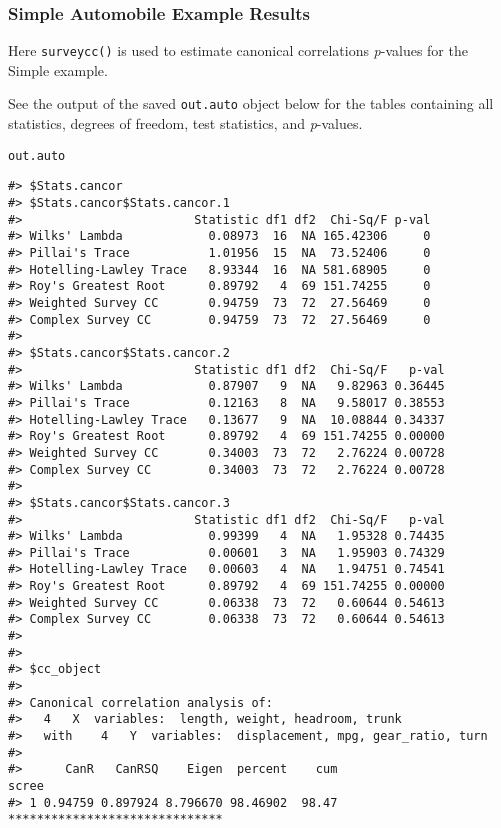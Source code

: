 \hypertarget{simple-automobile-example-results}{%
\subsubsection{Simple Automobile Example Results}\label{simple-automobile-example-results}}

Here \texttt{surveycc()} is used to estimate canonical correlations \emph{p}-values for the Simple example.

See the output of the saved \texttt{out.auto} object below for the tables containing all statistics, degrees of freedom, test statistics, and \emph{p}-values.

\begin{verbatim}
out.auto
\end{verbatim}

\begin{verbatim}
#> $Stats.cancor
#> $Stats.cancor$Stats.cancor.1
#>                        Statistic df1 df2  Chi-Sq/F p-val
#> Wilks' Lambda            0.08973  16  NA 165.42306     0
#> Pillai's Trace           1.01956  15  NA  73.52406     0
#> Hotelling-Lawley Trace   8.93344  16  NA 581.68905     0
#> Roy's Greatest Root      0.89792   4  69 151.74255     0
#> Weighted Survey CC       0.94759  73  72  27.56469     0
#> Complex Survey CC        0.94759  73  72  27.56469     0
#> 
#> $Stats.cancor$Stats.cancor.2
#>                        Statistic df1 df2  Chi-Sq/F   p-val
#> Wilks' Lambda            0.87907   9  NA   9.82963 0.36445
#> Pillai's Trace           0.12163   8  NA   9.58017 0.38553
#> Hotelling-Lawley Trace   0.13677   9  NA  10.08844 0.34337
#> Roy's Greatest Root      0.89792   4  69 151.74255 0.00000
#> Weighted Survey CC       0.34003  73  72   2.76224 0.00728
#> Complex Survey CC        0.34003  73  72   2.76224 0.00728
#> 
#> $Stats.cancor$Stats.cancor.3
#>                        Statistic df1 df2  Chi-Sq/F   p-val
#> Wilks' Lambda            0.99399   4  NA   1.95328 0.74435
#> Pillai's Trace           0.00601   3  NA   1.95903 0.74329
#> Hotelling-Lawley Trace   0.00603   4  NA   1.94751 0.74541
#> Roy's Greatest Root      0.89792   4  69 151.74255 0.00000
#> Weighted Survey CC       0.06338  73  72   0.60644 0.54613
#> Complex Survey CC        0.06338  73  72   0.60644 0.54613
#> 
#> 
#> $cc_object
#> 
#> Canonical correlation analysis of:
#>   4   X  variables:  length, weight, headroom, trunk 
#>   with    4   Y  variables:  displacement, mpg, gear_ratio, turn 
#> 
#>      CanR   CanRSQ    Eigen  percent    cum                          scree
#> 1 0.94759 0.897924 8.796670 98.46902  98.47 ******************************

\end{verbatim}
